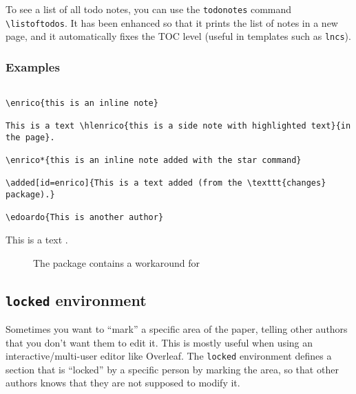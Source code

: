 \documentclass[a4paper]{article}
\newcommand\B[1]{\texttt{\textbackslash #1}}
\begin{document}
To see a list of all todo notes, you can use the \texttt{todonotes} command \B{listoftodos}. It has been enhanced so that it prints the list of notes in a new page, and it automatically fixes the TOC level (useful in templates such as \texttt{lncs}).

\subsubsection{Examples}

\begin{verbatim}

\enrico{this is an inline note}

This is a text \hlenrico{this is a side note with highlighted text}{in the page}.

\enrico*{this is an inline note added with the star command}

\added[id=enrico]{This is a text added (from the \texttt{changes} package).}

\edoardo{This is another author}

\end{verbatim}


This is a text .




\begin{figure}
\centering
\caption{The package contains a workaround for }
\end{figure}



\subsection{\texttt{locked} environment}

Sometimes you want to ``mark'' a specific area of the paper, telling other authors that you don't want them to edit it. This is mostly useful when using an interactive/multi-user editor like Overleaf. The \texttt{locked} environment defines a section that is ``locked'' by a specific person by marking the area, so that other authors knows that they are not supposed to modify it.
\end{document}
